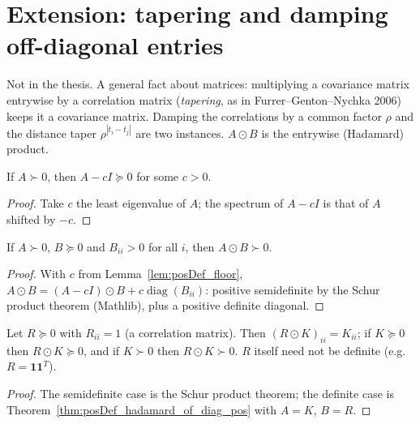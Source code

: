 \chapter{Extension: tapering and damping off-diagonal entries}\label{ch:offdiag}

Not in the thesis. A general fact about matrices: multiplying a covariance
matrix entrywise by a correlation matrix (\emph{tapering}, as in
Furrer--Genton--Nychka 2006) keeps it a covariance matrix. Damping the
correlations by a common factor $\rho$ and the distance taper
$\rho^{|t_i-t_j|}$ are two instances. $A \odot B$ is the entrywise
(Hadamard) product.

\begin{lemma}\label{lem:posDef_floor}
  \leanok
  If $A \succ 0$, then $A - cI \succeq 0$ for some $c > 0$.
\end{lemma}
\begin{proof}
  \leanok
  Take $c$ the least eigenvalue of $A$; the spectrum of $A - cI$ is that of
  $A$ shifted by $-c$.
\end{proof}

\begin{theorem}\label{thm:posDef_hadamard_of_diag_pos}
  \leanok
  If $A \succ 0$, $B \succeq 0$ and $B_{ii} > 0$ for all $i$, then
  $A \odot B \succ 0$.
\end{theorem}
\begin{proof}
  \leanok
  With $c$ from Lemma~\ref{lem:posDef_floor},
  $A \odot B = (A - cI)\odot B + c\operatorname{diag}(B_{ii})$: positive
  semidefinite by the Schur product theorem (Mathlib), plus a positive
  definite diagonal.
\end{proof}

\begin{theorem}\label{thm:hadamard_corr}
  \leanok
  Let $R \succeq 0$ with $R_{ii} = 1$ (a correlation matrix). Then
  $(R\odot K)_{ii} = K_{ii}$; if $K \succeq 0$ then $R \odot K \succeq 0$, and if
  $K \succ 0$ then $R \odot K \succ 0$. $R$ itself need not be definite
  (e.g.\ $R = \mathbf 1\mathbf 1^T$).
\end{theorem}
\begin{proof}
  \leanok
  The semidefinite case is the Schur product theorem; the definite case is
  Theorem~\ref{thm:posDef_hadamard_of_diag_pos} with $A = K$, $B = R$.
\end{proof}

